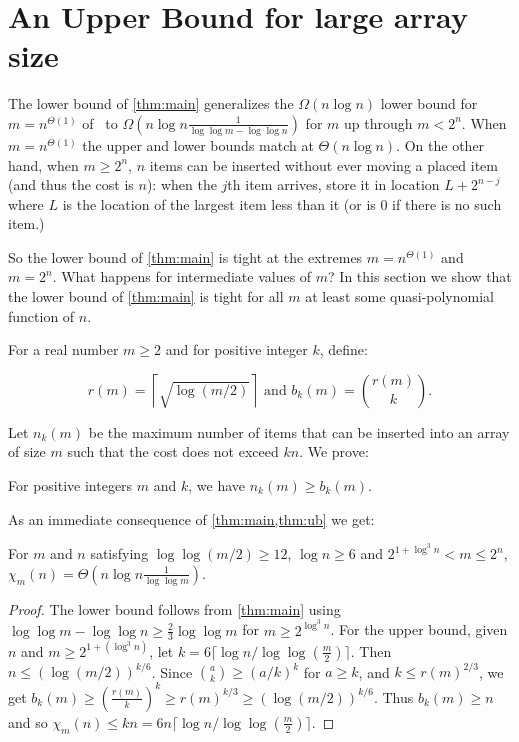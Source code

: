 \documentclass[unicode,review]{siamart1116}
\numberwithin{theorem}{section}
\begin{document}
\section{An Upper Bound for large array size}
\label{s-ub}

The lower bound of \cref{thm:main} generalizes the $\Omega(n \log n)$ lower bound 
for $m=n^{\Theta(1)}$ of~\cite{DSZ04} to  $\Omega(n\log n \frac{1}{\log\log m -\log\log n})$  for  $m$ up through $m<2^n$.   
When $m=n^{\Theta(1)}$ the upper and lower bounds match at $\Theta(n \log n)$.  On the other hand, when
$m \geq 2^n$,  $n$ items can be inserted without ever moving a placed item (and thus the cost is $n$):
when the $j$th item arrives, 
store it in location $L+2^{n-j}$ where $L$ is the location of the largest item less than it
(or is 0 if there is no such item.)
 
So the lower bound of \cref{thm:main} is tight at the extremes $m=n^{\Theta(1)}$ and $m=2^n$.  What happens for intermediate values of $m$?
In this section we show that the  lower bound of \cref{thm:main} is tight for all $m$ at least some quasi-polynomial function of $n$.  

For a real number $m \geq 2$ and for positive integer $k$, define:

\[
r(m) = \left\lceil \sqrt{\log(m/2)}  \right\rceil \text{ and } 
b_k(m)  =  \binom{r(m)}{k}.
\]


Let $n_k(m)$ be the maximum number of items that can be inserted into an array of size $m$ such that the cost does not exceed $kn$. We prove:

\begin{theorem}
\label{thm:ub}
For positive integers $m$ and $k$, we have $n_k(m) \geq b_k(m)$. 
\end{theorem}
 
As an immediate consequence of \cref{thm:main,thm:ub} we get:

\begin{corollary}
For $m$ and $n$ satisfying $\log \log (m/2) \ge 12$, $\log n \ge 6$ and $2^{1+\log^3 n} < m \leq 2^n$, $\chi_m(n) = \Theta(n \log n \frac{1}{\log\log m})$.
\end{corollary}

\begin{proof}
The lower bound follows from \cref{thm:main} using $\log\log m - \log\log n \geq \frac{2}{3} \log\log m$
for   $m\geq 2^{\log^3 n}$.
For the upper bound, given $n$ and $m \geq 2^{1+(\log^3 n)}$, let $k= 6\lceil \log n/\log\log (\frac{m}{2}) \rceil$.
Then $n \leq (\log (m/2))^{k/6}$. Since $\binom{a}{k} \geq (a/k)^k$ for $a\ge k$,   
and $k \leq r(m)^{2/3}$, we get
$b_k(m) \geq (\frac{r(m)}{k})^k \geq r(m)^{k/3} \geq (\log (m/2))^{k/6}$. Thus $b_k(m) \ge n$ and so
$\chi_m(n) \leq  k n = 6 n \lceil \log n/\log\log (\frac{m}{2}) \rceil $. 
\end{proof}
\end{document}
